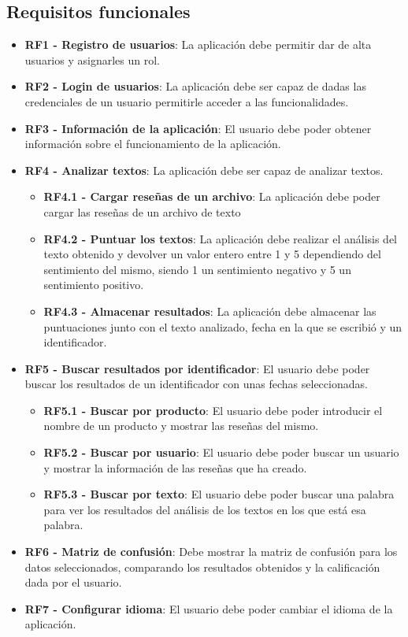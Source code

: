 \subsection{Requisitos funcionales}
\begin{itemize}
	\tightlist
	\item \textbf{RF1 - Registro de usuarios}: La aplicación debe permitir dar de alta usuarios y asignarles un rol.
	\item \textbf{RF2 - Login de usuarios}: La aplicación debe ser capaz de dadas las credenciales de un usuario permitirle acceder a las funcionalidades. 
	\item \textbf{RF3 - Información de la aplicación}: El usuario debe poder obtener información sobre el funcionamiento de la aplicación. 
	\item \textbf{RF4 - Analizar textos}: La aplicación debe ser capaz de analizar textos.
	\begin{itemize}
		\item \textbf{RF4.1 - Cargar reseñas de un archivo}: La aplicación debe poder cargar las reseñas de un archivo de texto
		\item \textbf{RF4.2 - Puntuar los textos}: La aplicación debe realizar el análisis del texto obtenido y devolver un valor entero entre 1 y 5 dependiendo del sentimiento del mismo, siendo 1 un sentimiento negativo y 5 un sentimiento positivo.     
		\item \textbf{RF4.3 - Almacenar resultados}: La aplicación debe almacenar las puntuaciones junto con el texto analizado, fecha en la que se escribió y un identificador. 
	\end{itemize}
	\item \textbf{RF5 - Buscar resultados por identificador}: El usuario debe poder buscar los resultados de un identificador con unas fechas seleccionadas. 
	\begin{itemize}
		\item \textbf{RF5.1 - Buscar por producto}: El usuario debe poder introducir el nombre de un producto y mostrar las reseñas del mismo. 
		\item \textbf{RF5.2 - Buscar por usuario}: El usuario debe poder buscar un usuario y mostrar la información de las reseñas que ha creado. 
		\item \textbf{RF5.3 - Buscar por texto}: El usuario debe poder buscar una palabra para ver los resultados del análisis de los textos en los que está esa palabra.
	\end{itemize}
	\item \textbf{RF6 - Matriz de confusión}: Debe mostrar la matriz de confusión para los datos seleccionados, comparando los resultados obtenidos y la calificación dada por el usuario.
	\item \textbf{RF7 - Configurar idioma}: El usuario debe poder cambiar el idioma de la aplicación. 
\end{itemize}      
